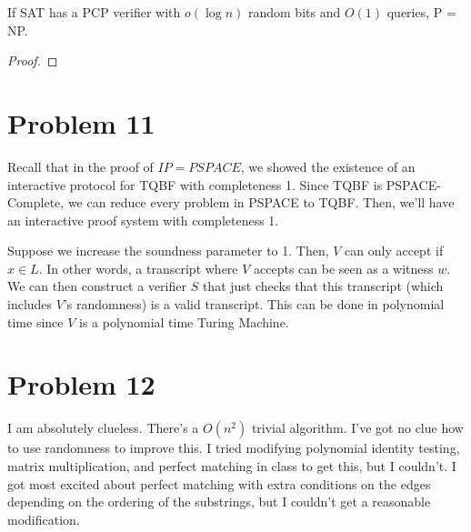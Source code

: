\documentclass[usletter]{article}
\begin{document}
\begin{lemma}
    If SAT has a PCP verifier with $o(\log n)$ random bits and $O(1)$ queries,
    P = NP.
\end{lemma}
\begin{proof}

\end{proof}

\newpage

\section*{Problem 11}

Recall that in the proof of $IP = PSPACE$, we showed
the existence of an interactive protocol for TQBF
with completeness 1. Since TQBF is PSPACE-Complete,
we can reduce every problem in PSPACE to TQBF. Then,
we'll have an interactive proof system with completeness 1.

Suppose we increase the soundness parameter to 1.
Then, $V$ can only accept if $x \in L$. In other words,
a transcript where $V$ accepts can be seen as a witness
$w$. We can then construct a verifier $S$ that just checks
that this transcript (which includes $V$'s randomness)
is a valid transcript. This can be done in polynomial time
since $V$ is a polynomial time Turing Machine.

\newpage

\section*{Problem 12}

I am absolutely clueless. There's a $O(n^{2})$ trivial algorithm.
I've got no clue how to use randomness to improve this. I tried
modifying polynomial identity testing, matrix multiplication,
and perfect matching in class to get this, but I couldn't. I got
most excited about perfect matching with extra conditions on the edges depending
on the ordering of the substrings, but I couldn't get a reasonable modification.

\newpage
\end{document}
